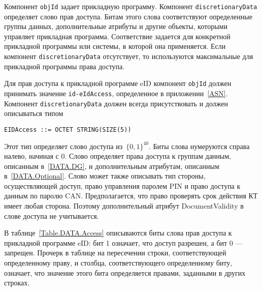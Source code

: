 Компонент \verb|objId| задает прикладную программу. 
Компонент \verb|discretionaryData| определяет слово прав доступа. 
Битам этого слова соответствуют определенные группы данных, 
дополнительные атрибуты и другие объекты, 
которыми управляет прикладная программа. Соответствие задается для 
конкретной прикладной программы или системы, в которой она применяется. 
Если компонент \verb|discretionaryData| отсутствует, 
то используются максимальные для прикладной программы права доступа. 

Для прав доступа к прикладной программе eID компонент \verb|objId| должен принимать 
значение \verb|id-eIdAccess|, определенное в приложении~\ref{ASN}. 
Компонент \verb|discretionaryData| должен всегда присутствовать и 
должен описываться типом  

\begin{verbatim}
EIDAccess ::= OCTET STRING(SIZE(5))
\end{verbatim}

Этот тип определяет слово доступа из~$\{0,1\}^{40}$. 
Биты слова нумеруются справа налево, начиная с 0. 
Слово определяет права доступа к группам данным, описанным в~\ref{DATA.DG}, 
и дополнительным атрибутам, описанным в~\ref{DATA.Optional}. 
Слово может также описывать тип стороны, осуществляющей доступ, право 
управления паролем PIN и право доступа к данным по паролю CAN. 
Предполагается, что право проверять срок действия КТ имеет любая сторона. 
Поэтому дополнительный атрибут DocumentValidity в слове доступа не 
учитывается. 

В таблице~\ref{Table.DATA.Access} описываются биты слова прав 
доступа к прикладной программе eID: бит 1 означает,
что доступ разрешен, а бит 0 --- запрещен.
Прочерк в таблице 
на пересечении строки, соответствующей определенному праву, и столбца, 
соответствующего определенному биту, означает, что значение этого бита 
определяется правами, заданными в других строках.  

